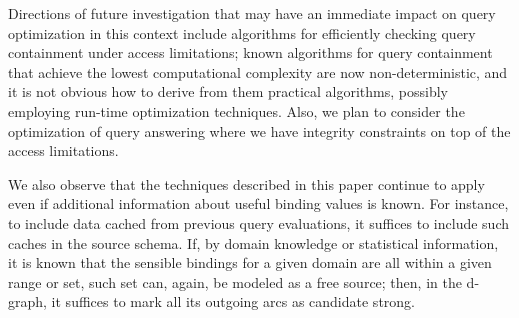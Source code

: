 Directions of future investigation that may have an immediate impact on query
optimization in this context include algorithms for efficiently checking query
containment under access limitations; known algorithms for query containment
that achieve the lowest computational complexity are now non-deterministic, and
it is not obvious how to derive from them practical algorithms, possibly
employing run-time optimization techniques.  Also, we plan to consider the
optimization of query answering where we have integrity constraints on top of
the access limitations.

We also observe that the techniques described in this paper continue to apply
even if additional information about useful binding values is known.  For
instance, to include data cached from previous query evaluations, it suffices
to include such caches in the source schema.  If, by domain knowledge or
statistical information, it is known that the sensible bindings for a given
domain are all within a given range or set, such set can, again, be modeled as
a free source; then, in the d-graph, it suffices to mark all its outgoing arcs
as candidate strong.

